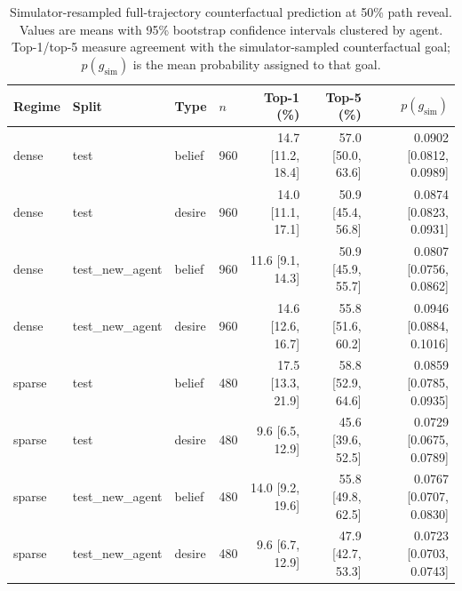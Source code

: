 \begin{table}[t]
  \centering
  \scriptsize
  \setlength{\tabcolsep}{4pt}
  \caption{Simulator-resampled full-trajectory counterfactual prediction at 50\% path reveal. Values are means with 95\% bootstrap confidence intervals clustered by agent. Top-1/top-5 measure agreement with the simulator-sampled counterfactual goal; $p(g_{\mathrm{sim}})$ is the mean probability assigned to that goal.}
  \label{tab:simulator_rollout}
  \begin{tabular}{llllrrr}
    \toprule
    Regime & Split & Type & $n$ & Top-1 (\%) & Top-5 (\%) & $p(g_{\mathrm{sim}})$ \\
    \midrule
    dense & test & belief & 960 & 14.7 [11.2, 18.4] & 57.0 [50.0, 63.6] & 0.0902 [0.0812, 0.0989] \\
    dense & test & desire & 960 & 14.0 [11.1, 17.1] & 50.9 [45.4, 56.8] & 0.0874 [0.0823, 0.0931] \\
    dense & test\_new\_agent & belief & 960 & 11.6 [9.1, 14.3] & 50.9 [45.9, 55.7] & 0.0807 [0.0756, 0.0862] \\
    dense & test\_new\_agent & desire & 960 & 14.6 [12.6, 16.7] & 55.8 [51.6, 60.2] & 0.0946 [0.0884, 0.1016] \\
    sparse & test & belief & 480 & 17.5 [13.3, 21.9] & 58.8 [52.9, 64.6] & 0.0859 [0.0785, 0.0935] \\
    sparse & test & desire & 480 & 9.6 [6.5, 12.9] & 45.6 [39.6, 52.5] & 0.0729 [0.0675, 0.0789] \\
    sparse & test\_new\_agent & belief & 480 & 14.0 [9.2, 19.6] & 55.8 [49.8, 62.5] & 0.0767 [0.0707, 0.0830] \\
    sparse & test\_new\_agent & desire & 480 & 9.6 [6.7, 12.9] & 47.9 [42.7, 53.3] & 0.0723 [0.0703, 0.0743] \\
    \bottomrule
  \end{tabular}
\end{table}
